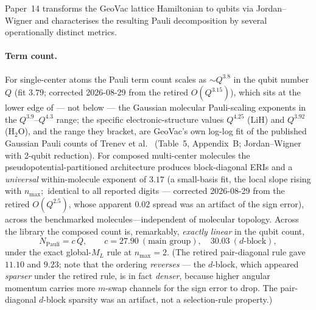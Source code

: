 \documentclass[aps,pra,twocolumn,superscriptaddress,longbibliography]{revtex4-2}
\begin{document}
Paper~14 transforms the GeoVac lattice Hamiltonian to qubits via
Jordan--Wigner and characterises the resulting Pauli decomposition by
several operationally distinct metrics.

\paragraph{Term count.}
For single-center atoms the Pauli term count scales as $\sim Q^{3.8}$ in
the qubit number $Q$ (fit $3.79$; corrected 2026-08-29 from the retired
$O(Q^{3.15})$), which sits at the lower edge of --- not below --- the
Gaussian molecular Pauli-scaling exponents in the $Q^{3.9}$--$Q^{4.3}$
range; the
specific electronic-structure values $Q^{4.25}$ (LiH) and $Q^{3.92}$
(H$_2$O), and the range they bracket, are GeoVac's own log-log fit of
the published Gaussian Pauli counts of Trenev et al.~\cite{trenev2025}
(Table~5, Appendix~B; Jordan--Wigner with 2-qubit reduction).
For composed multi-center molecules the pseudopotential-partitioned
architecture produces block-diagonal ERIs and a \emph{universal} within-molecule exponent of $3.17$ (a small-basis fit, the local slope rising with $n_{\max}$;\ identical to all
reported digits --- corrected 2026-08-29 from the retired $O(Q^{2.5})$,
whose apparent $0.02$ spread was an artifact of the sign error), across the
benchmarked molecules---independent of molecular topology.  Across the
library the composed count is, remarkably, \emph{exactly linear} in the
qubit count,
\begin{equation}
N_{\mathrm{Pauli}} = c\,Q,\qquad
c = 27.90~(\text{main group}),\quad 30.03~(d\text{-block}),
\label{eq:linearity}
\end{equation}
under the exact global-$M_L$ rule at $n_{\max}=2$.  (The retired
pair-diagonal rule gave $11.10$ and $9.23$; note that the ordering
\emph{reverses} --- the $d$-block, which appeared \emph{sparser} under the
retired rule, is in fact \emph{denser}, because higher angular momentum
carries more $m$-swap channels for the sign error to drop.  The
pair-diagonal $d$-block sparsity was an artifact, not a selection-rule
property.)
\end{document}
